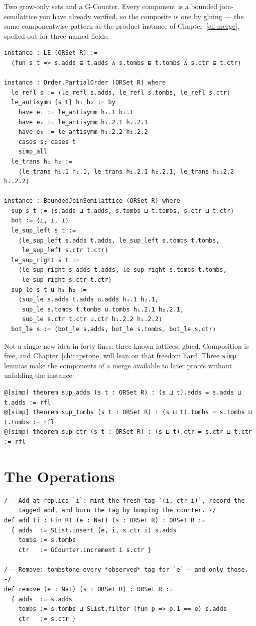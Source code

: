 \documentclass[12pt, a4paper, openright]{book}
\theoremstyle{thmstyle}
\theoremstyle{defstyle}
\newcommand{\lc}[1]{\texttt{#1}}
\begin{document}
Two grow-only sets and a G-Counter. Every component is a bounded
join-semilattice you have already verified, so the composite is one by
gluing --- the same componentwise pattern as the product instance of
Chapter~\ref{ch:merge}, spelled out for three named fields:

\begin{verbatim}
instance : LE (ORSet R) :=
  ⟨fun s t => s.adds ⊑ t.adds ∧ s.tombs ⊑ t.tombs ∧ s.ctr ⊑ t.ctr⟩

instance : Order.PartialOrder (ORSet R) where
  le_refl s := ⟨le_refl s.adds, le_refl s.tombs, le_refl s.ctr⟩
  le_antisymm {s t} h₁ h₂ := by
    have e₁ := le_antisymm h₁.1 h₂.1
    have e₂ := le_antisymm h₁.2.1 h₂.2.1
    have e₃ := le_antisymm h₁.2.2 h₂.2.2
    cases s; cases t
    simp_all
  le_trans h₁ h₂ :=
    ⟨le_trans h₁.1 h₂.1, le_trans h₁.2.1 h₂.2.1, le_trans h₁.2.2 h₂.2.2⟩

instance : BoundedJoinSemilattice (ORSet R) where
  sup s t := ⟨s.adds ⊔ t.adds, s.tombs ⊔ t.tombs, s.ctr ⊔ t.ctr⟩
  bot := ⟨⊥, ⊥, ⊥⟩
  le_sup_left s t :=
    ⟨le_sup_left s.adds t.adds, le_sup_left s.tombs t.tombs,
     le_sup_left s.ctr t.ctr⟩
  le_sup_right s t :=
    ⟨le_sup_right s.adds t.adds, le_sup_right s.tombs t.tombs,
     le_sup_right s.ctr t.ctr⟩
  sup_le s t u h₁ h₂ :=
    ⟨sup_le s.adds t.adds u.adds h₁.1 h₂.1,
     sup_le s.tombs t.tombs u.tombs h₁.2.1 h₂.2.1,
     sup_le s.ctr t.ctr u.ctr h₁.2.2 h₂.2.2⟩
  bot_le s := ⟨bot_le s.adds, bot_le s.tombs, bot_le s.ctr⟩
\end{verbatim}

Not a single new idea in forty lines: three known lattices, glued.
Composition is free, and Chapter~\ref{ch:capstone} will lean on that
freedom hard. Three \lc{simp} lemmas make the components of a merge
available to later proofs without unfolding the instance:

\begin{verbatim}
@[simp] theorem sup_adds (s t : ORSet R) : (s ⊔ t).adds = s.adds ⊔ t.adds := rfl
@[simp] theorem sup_tombs (s t : ORSet R) : (s ⊔ t).tombs = s.tombs ⊔ t.tombs := rfl
@[simp] theorem sup_ctr (s t : ORSet R) : (s ⊔ t).ctr = s.ctr ⊔ t.ctr := rfl
\end{verbatim}

\section{The Operations}
\label{sec:orset-ops}

\begin{verbatim}
/-- Add at replica `i`: mint the fresh tag `(i, ctr i)`, record the
    tagged add, and burn the tag by bumping the counter. -/
def add (i : Fin R) (e : Nat) (s : ORSet R) : ORSet R :=
  { adds  := SList.insert (e, i, s.ctr i) s.adds
    tombs := s.tombs
    ctr   := GCounter.increment i s.ctr }

/-- Remove: tombstone every *observed* tag for `e` — and only those. -/
def remove (e : Nat) (s : ORSet R) : ORSet R :=
  { adds  := s.adds
    tombs := s.tombs ⊔ SList.filter (fun p => p.1 == e) s.adds
    ctr   := s.ctr }
\end{verbatim}
\end{document}
